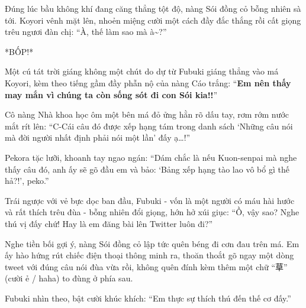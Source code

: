 \documentclass[../main.tex]{subfiles}
\begin{document}
Đúng lúc bầu không khí đang căng thẳng tột độ, nàng Sói đồng cỏ bỗng nhiên sà tới. Koyori vênh mặt lên, nhoẻn miệng cười một cách đầy đắc thắng rồi cất giọng trêu ngươi đàn chị: ``À, thế làm sao mà à\~{}?''

*BỐP!*

Một cú tát trời giáng không một chút do dự từ Fubuki giáng thẳng vào má Koyori, kèm theo tiếng gầm đầy phẫn nộ của nàng Cáo trắng: ``\textbf{Em nên thấy may mắn vì chúng ta còn sống sót đi con Sói kia!!}''

Cô nàng Nhà khoa học ôm một bên má đỏ ửng hằn rõ dấu tay, rơm rớm nước mắt rít lên: ``C-Cái câu đó được xếp hạng tám trong danh sách `Những câu nói mà đời người nhất định phải nói một lần' đấy ạ\dots!''

Pekora tặc lưỡi, khoanh tay ngao ngán: ``Dám chắc là nếu Kuon-senpai mà nghe thấy câu đó, anh ấy sẽ gõ đầu em và bảo: `Bảng xếp hạng tào lao vô bổ gì thế hả?!', peko.''



Trái ngược với vẻ bực dọc ban đầu, Fubuki - vốn là một người có máu hài hước và rất thích trêu đùa - bỗng nhiên đổi giọng, hớn hở xúi giục: ``Ồ, vậy sao? Nghe thú vị đấy chứ! Hay là em đăng bài lên Twitter luôn đi?''

Nghe tiền bối gợi ý, nàng Sói đồng cỏ lập tức quên béng đi cơn đau trên má. Em ấy hào hứng rút chiếc điện thoại thông minh ra, thoăn thoắt gõ ngay một dòng tweet với đúng câu nói đùa vừa rồi, không quên đính kèm thêm một chữ ``草'' (cười ẻ / haha) to đùng ở phía sau.

Fubuki nhìn theo, bật cười khúc khích: ``Em thực sự thích thú đến thế cơ đấy.''
\end{document}
